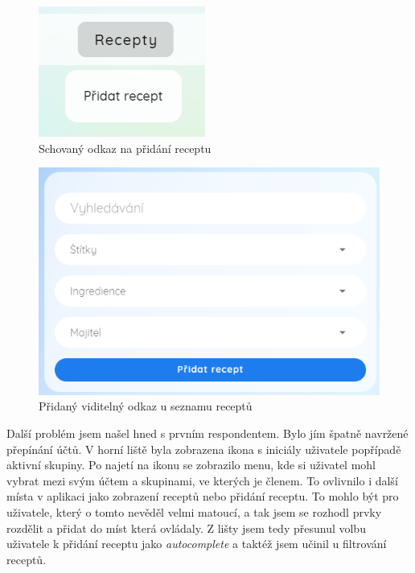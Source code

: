 \begin{figure}[H]
    \includegraphics[width=\textwidth]{images/recipeo-hover}
    \caption{Schovaný odkaz na přidání receptu} \label{picture:recipeo:hover}
\end{figure}

\begin{figure}[H]
    \includegraphics[width=\textwidth]{images/recipeo-add-button}
    \caption{Přidaný viditelný odkaz u seznamu receptů} \label{picture:recipeo:add-button}
\end{figure}

Další problém jsem našel hned s prvním respondentem. Bylo jím špatně navržené přepínání účtů. V horní liště byla zobrazena ikona s iniciály uživatele
popřípadě aktivní skupiny. Po najetí na ikonu se zobrazilo menu, kde si uživatel mohl vybrat mezi svým účtem a skupinami, ve kterých je členem. To
ovlivnilo i další místa v aplikaci jako zobrazení receptů nebo přidání receptu. To mohlo být pro uživatele, který o tomto nevěděl velmi matoucí, a
tak jsem se rozhodl prvky rozdělit a přidat do míst která ovládaly. Z lišty jsem tedy přesunul volbu uživatele k přidání receptu jako \emph{autocomplete}
a taktéž jsem učinil u filtrování receptů.

